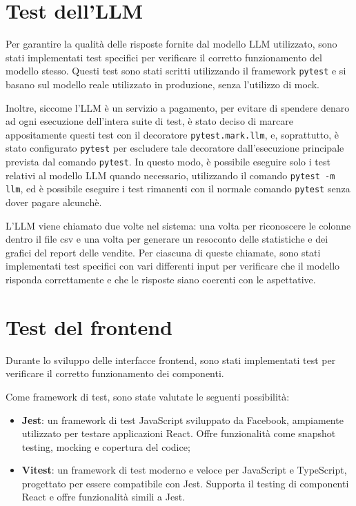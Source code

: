 \section{Test dell’LLM}

Per garantire la qualità delle risposte fornite dal modello LLM utilizzato, sono stati implementati test specifici per verificare il corretto funzionamento del modello stesso. Questi test sono stati scritti utilizzando il framework \texttt{pytest} e si basano sul modello reale utilizzato in produzione, senza l'utilizzo di mock.

Inoltre, siccome l'LLM è un servizio a pagamento, per evitare di spendere denaro ad ogni esecuzione dell'intera suite di test, è stato deciso di marcare appositamente questi test con il decoratore \texttt{pytest.mark.llm}, e, soprattutto, è stato configurato \texttt{pytest} per escludere tale decoratore dall'esecuzione principale prevista dal comando \texttt{pytest}.
In questo modo, è possibile eseguire solo i test relativi al modello LLM quando necessario, utilizzando il comando \texttt{pytest -m llm}, ed è possibile eseguire i test rimanenti con il normale comando \texttt{pytest} senza dover pagare alcunchè.

L'LLM viene chiamato due volte nel sistema: una volta per riconoscere le colonne dentro il file \gls{csv} e una volta per generare un resoconto delle statistiche e dei grafici del report delle vendite. Per ciascuna di queste chiamate, sono stati implementati test specifici con vari differenti input per verificare che il modello risponda correttamente e che le risposte siano coerenti con le aspettative.


\section{Test del frontend}

Durante lo sviluppo delle interfacce frontend, sono stati implementati test per verificare il corretto funzionamento dei componenti. 

Come framework di test, sono state valutate le seguenti possibilità:
\begin{itemize}
    \item \textbf{Jest}: un framework di test JavaScript sviluppato da Facebook, ampiamente utilizzato per testare applicazioni React. Offre funzionalità come snapshot testing, mocking e copertura del codice;
    \item \textbf{Vitest}: un framework di test moderno e veloce per JavaScript e TypeScript, progettato per essere compatibile con Jest. Supporta il testing di componenti React e offre funzionalità simili a Jest.
\end{itemize}

